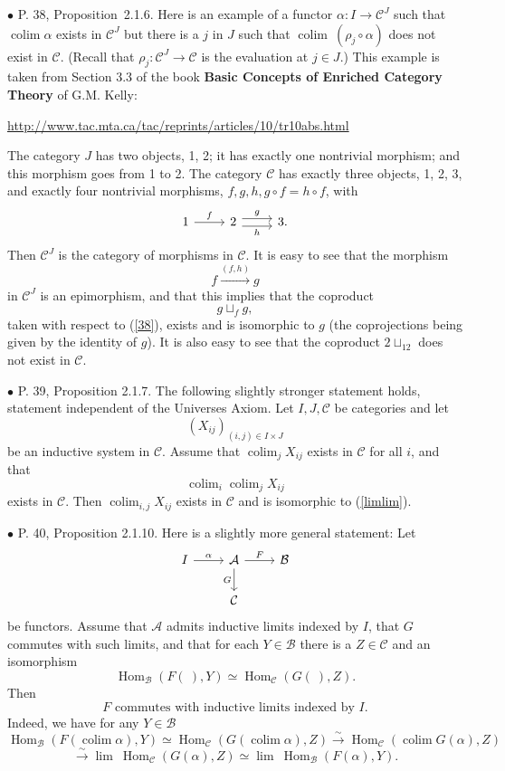 \documentclass[12pt]{article}
\theoremstyle{remark}%
\newcommand{\bu}{\bullet}
\newcommand{\n}{\noindent}
\newcommand{\A}{\mathcal A}
\newcommand{\B}{\mathcal B}
\newcommand{\C}{\mathcal C}
\newcommand{\pr}{Proposition}
\DeclareMathOperator*{\coli}{colim}
\DeclareMathOperator*{\co}{colim}
\DeclareMathOperator{\Hom}{Hom}
\begin{document}
\n$\bu$ P. 38, \pr\ 2.1.6. Here is an example of a functor $\alpha:I\to\C^J$ such that $\co\alpha$ exists in $\C^J$ but there is a $j$ in $J$ such that $\co\ (\rho_j\circ\alpha)$ does not exist in $\C$. (Recall that $\rho_j:\C^J\to\C$ is the evaluation at $j\in J$.) This example is taken from Section 3.3 of the book \textbf{Basic Concepts of Enriched Category Theory} of G.M. Kelly:\medskip 

\centerline{\href{http://www.tac.mta.ca/tac/reprints/articles/10/tr10abs.html}{http://www.tac.mta.ca/tac/reprints/articles/10/tr10abs.html}}

The category $J$ has two objects, 1, 2; it has exactly one nontrivial morphism; and this morphism goes from 1 to 2. The category $\C$ has exactly three objects, 1, 2, 3, and exactly four nontrivial morphisms, $f,g,h,g\circ f=h\circ f$, with 
$$
\begin{tikzcd}
1\ar{r}{f}&2\ar[yshift=.7ex]{r}{g}\ar[yshift=-.7ex]{r}[swap]{h}&3.
\end{tikzcd}
$$ 
Then $\C^J$ is the category of morphisms in $\C$. It is easy to see that the morphism 
%
\begin{equation}\label{38}
f\xrightarrow{(f,h)}g 
\end{equation}
%
in $\C^J$ is an epimorphism, and that this implies that the coproduct 
$$
g\sqcup_fg,
$$ 
taken with respect to (\ref{38}), exists and is isomorphic to $g$ (the coprojections being given by the identity of $g$). It is also easy to see that the coproduct $2\sqcup_12$ does not exist in $\C$. 


\n$\bu$ P. 39, Proposition 2.1.7. The following slightly stronger statement holds, statement independent of the Universes Axiom. Let $I, J, \C$ be categories and let 
$$
(X_{ij})_{(i,j)\in I\times J}
$$ 
be an inductive system in $\C$. Assume that $\coli_jX_{ij}$ exists in $\C$ for all $i$, and that 
\begin{equation}\label{limlim}
\coli_i\coli_jX_{ij}
\end{equation}
exists in $\C$. Then $\coli_{i,j}X_{ij}$ exists in $\C$ and is isomorphic to (\ref{limlim}).


\n$\bu$ P. 40, Proposition 2.1.10. Here is a slightly more general statement: Let 
$$
\begin{tikzcd}
I\ar{r}{\alpha}&\A\ar{d}[swap]{G}\ar{r}{F}&\B\\
&\C
\end{tikzcd}
$$
be functors. Assume that $\A$ admits inductive limits indexed by $I$, that $G$ commutes with such limits, and that for each $Y\in\B$ there is a $Z\in\C$ and an isomorphism 
$$
\Hom_\B(F(\ ),Y)\simeq\Hom_\C(G(\ ),Z). 
$$
Then 
\begin{equation}\label{2.1.10}
F\text{ commutes with inductive limits indexed by }I.
\end{equation}
Indeed, we have for any $Y\in\B$ 
$$ 
\Hom_\B\left(F\left(\coli\alpha\right),Y\right)\simeq
\Hom_\C\left(G\left(\coli\alpha\right),Z\right)
\overset{\sim}{\to}
\Hom_\C\left(\coli G(\alpha),Z\right)
$$
$$
\overset{\sim}{\to}\lim \ \Hom_\C(G(\alpha),Z)\simeq\lim \ \Hom_\B(F(\alpha),Y).
$$  
\end{document}
